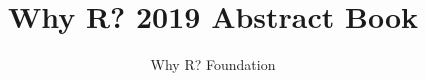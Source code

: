 \usepackage[utf8]{inputenc}
\usepackage{polski}

\title{Why R? 2019 Abstract Book}
\date{}
\author{Why R? Foundation}

% 

